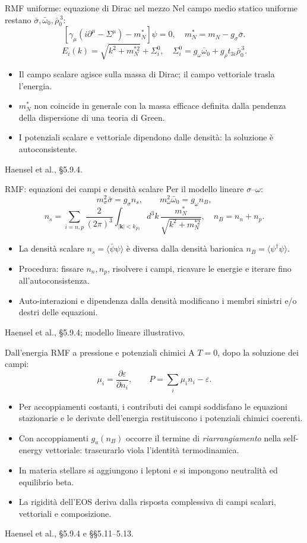 \begin{frame}[t]{RMF uniforme: equazione di Dirac nel mezzo}
\small
Nel campo medio statico uniforme restano $\bar\sigma,\bar\omega_0,\bar\rho_0^{\,3}$:
\[
\left[\gamma_\mu(i\partial^\mu-\Sigma^\mu)-m_N^*\right]\psi=0,
\quad m_N^*=m_N-g_\sigma\bar\sigma .
\]
\[
E_i(k)=\sqrt{k^2+m_N^{*2}}+\Sigma_i^0,\quad
\Sigma_i^0=g_\omega\bar\omega_0+
g_\rho t_{3i}\bar\rho_0^{\,3}.
\]
\begin{itemize}
\item Il campo scalare agisce sulla massa di Dirac; il campo vettoriale trasla l'energia.
\item $m_N^*$ non coincide in generale con la massa efficace definita dalla pendenza della dispersione di una teoria di Green.
\item I potenziali scalare e vettoriale dipendono dalle densità: la soluzione è autoconsistente.
\end{itemize}
{\footnotesize Haensel et al., §5.9.4.}
\end{frame}

\begin{frame}[t]{RMF: equazioni dei campi e densità scalare}
\small
Per il modello lineare $\sigma$--$\omega$:
\[
m_\sigma^2\bar\sigma=g_\sigma n_s,\qquad
m_\omega^2\bar\omega_0=g_\omega n_B ,
\]
\[
n_s=\sum_{i=n,p}\frac{2}{(2\pi)^3}
\int_{|\mathbf k|<k_{Fi}}\!d^3k\,
\frac{m_N^*}{\sqrt{k^2+m_N^{*2}}},
\quad n_B=n_n+n_p.
\]
\begin{itemize}
\item La densità scalare $n_s=\langle\bar\psi\psi\rangle$ è diversa dalla densità barionica $n_B=\langle\psi^\dagger\psi\rangle$.
\item Procedura: fissare $n_n,n_p$, risolvere i campi, ricavare le energie e iterare fino all'autoconsistenza.
\item Auto-interazioni e dipendenza dalla densità modificano i membri sinistri e/o destri delle equazioni.
\end{itemize}
{\footnotesize Haensel et al., §5.9.4; modello lineare illustrativo.}
\end{frame}

\begin{frame}[t]{Dall'energia RMF a pressione e potenziali chimici}
\small
A $T=0$, dopo la soluzione dei campi:
\[
\mu_i=\frac{\partial\varepsilon}{\partial n_i},\qquad
P=\sum_i\mu_i n_i-\varepsilon.
\]
\begin{itemize}
\item Per accoppiamenti costanti, i contributi dei campi soddisfano le equazioni stazionarie e le derivate dell'energia restituiscono i potenziali chimici coerenti.
\item Con accoppiamenti $g_a(n_B)$ occorre il termine di \emph{riarrangiamento} nella self-energy vettoriale: trascurarlo viola l'identità termodinamica.
\item In materia stellare si aggiungono i leptoni e si impongono neutralità ed equilibrio beta.
\item La rigidità dell'EOS deriva dalla risposta complessiva di campi scalari, vettoriali e composizione.
\end{itemize}
{\footnotesize Haensel et al., §5.9.4 e §§5.11--5.13.}
\end{frame}

